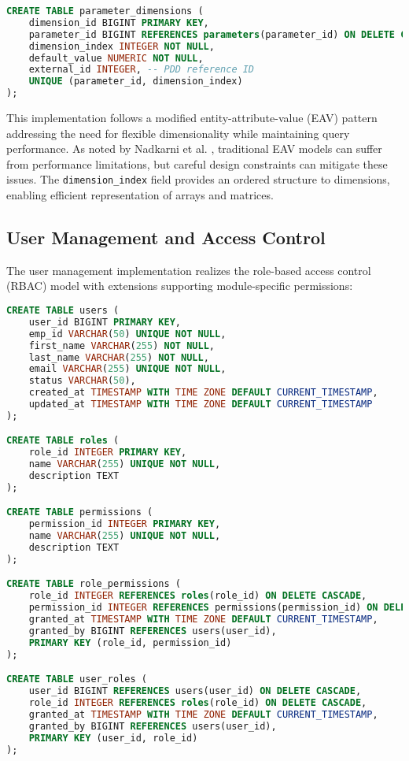 \begin{lstlisting}[language=SQL, caption={Parameter Dimension Table Implementation}, label={lst:parameter-dimension-table}]
CREATE TABLE parameter_dimensions (
    dimension_id BIGINT PRIMARY KEY,
    parameter_id BIGINT REFERENCES parameters(parameter_id) ON DELETE CASCADE,
    dimension_index INTEGER NOT NULL,
    default_value NUMERIC NOT NULL,
    external_id INTEGER, -- PDD reference ID
    UNIQUE (parameter_id, dimension_index)
);
\end{lstlisting}

This implementation follows a modified entity-attribute-value (EAV) pattern addressing the need for flexible dimensionality while maintaining query performance. As noted by Nadkarni et al. \cite{nadkarni2016revisiting}, traditional EAV models can suffer from performance limitations, but careful design constraints can mitigate these issues. The \texttt{dimension\_index} field provides an ordered structure to dimensions, enabling efficient representation of arrays and matrices.

\subsection{User Management and Access Control}
\label{subsec:user-management-access-control-implementation}

The user management implementation realizes the role-based access control (RBAC) model with extensions supporting module-specific permissions:

\begin{lstlisting}[language=SQL, caption={Core RBAC Table Implementation}, label={lst:rbac-tables}]
CREATE TABLE users (
    user_id BIGINT PRIMARY KEY,
    emp_id VARCHAR(50) UNIQUE NOT NULL,
    first_name VARCHAR(255) NOT NULL,
    last_name VARCHAR(255) NOT NULL,
    email VARCHAR(255) UNIQUE NOT NULL,
    status VARCHAR(50),
    created_at TIMESTAMP WITH TIME ZONE DEFAULT CURRENT_TIMESTAMP,
    updated_at TIMESTAMP WITH TIME ZONE DEFAULT CURRENT_TIMESTAMP
);

CREATE TABLE roles (
    role_id INTEGER PRIMARY KEY,
    name VARCHAR(255) UNIQUE NOT NULL,
    description TEXT
);

CREATE TABLE permissions (
    permission_id INTEGER PRIMARY KEY,
    name VARCHAR(255) UNIQUE NOT NULL,
    description TEXT
);

CREATE TABLE role_permissions (
    role_id INTEGER REFERENCES roles(role_id) ON DELETE CASCADE,
    permission_id INTEGER REFERENCES permissions(permission_id) ON DELETE CASCADE,
    granted_at TIMESTAMP WITH TIME ZONE DEFAULT CURRENT_TIMESTAMP,
    granted_by BIGINT REFERENCES users(user_id),
    PRIMARY KEY (role_id, permission_id)
);

CREATE TABLE user_roles (
    user_id BIGINT REFERENCES users(user_id) ON DELETE CASCADE,
    role_id INTEGER REFERENCES roles(role_id) ON DELETE CASCADE,
    granted_at TIMESTAMP WITH TIME ZONE DEFAULT CURRENT_TIMESTAMP,
    granted_by BIGINT REFERENCES users(user_id),
    PRIMARY KEY (user_id, role_id)
);
\end{lstlisting}

